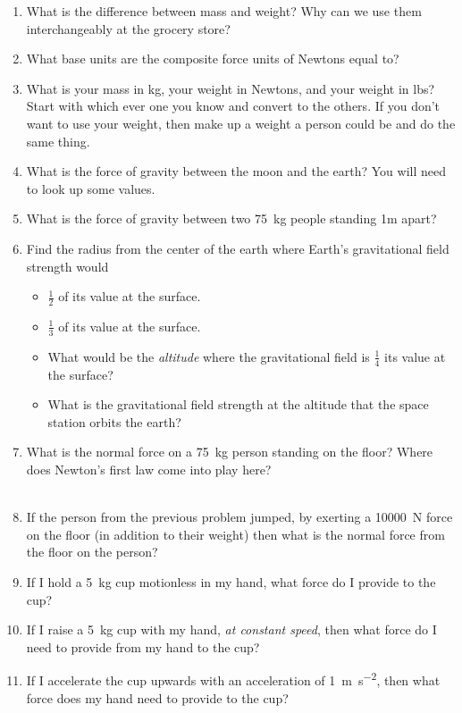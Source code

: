 \begin{enumerate}
\setlength\itemsep{1 in}

\item What is the difference between mass and weight? Why can we use them interchangeably at the grocery store?

\item What base units are the composite force units of Newtons equal to?

\item What is your mass in kg, your weight in Newtons, and your weight in lbs? Start with which ever one you know and convert to the others. If you don't want to use your weight, then make up a weight a person could be and do the same thing.

\item What is the force of gravity between the moon and the earth? You will need to look up some values.

\item What is the force of gravity between two \SI{75}{\kilogram} people standing 1m apart?\bigskip

\item Find the radius from the center of the earth where Earth's gravitational field strength would 

\begin{itemize}
	\item $\tfrac{1}{2}$ of its value at the surface.
	\item $\tfrac{1}{3}$ of its value at the surface.
	\item What would be the \emph{altitude} where the gravitational field is $\tfrac{1}{4}$ its value at the surface?
	\item What is the gravitational field strength at the altitude that the space station orbits the earth?
\end{itemize}
\hugeskip


\item What is the normal force on a \SI{75}{\kilogram} person standing on the floor? Where does Newton's first law come into play here?\\
\\

\item If the person from the previous problem jumped, by exerting a \SI{10000}{N} force on the floor (in addition to their weight) then what is the normal force from the floor on the person?\hugeskip

\item If I hold a \SI{5}{\kilogram} cup motionless in my hand, what force do I provide to the cup?\\
\item If I raise a \SI{5}{\kilogram} cup with my hand, \emph{at constant speed}, then what force do I need to provide from my hand to the cup?\\
\item If I accelerate the cup upwards with an acceleration of \SI{+1}{\meter \per \second^2}, then what force does my hand need to provide to the cup?\\


\end{enumerate}

